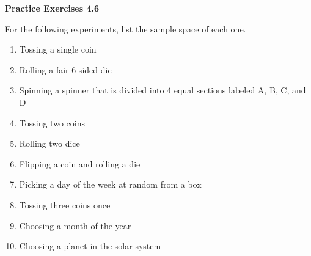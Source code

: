  \vspace{1ex}
\noindent\textbf{Practice Exercises 4.6}

\vspace{0.75ex}

For the following experiments, list the sample space of each one.

\begin{enumerate}
    \item Tossing a single coin

    \item Rolling a fair 6-sided die
    
    \item Spinning a spinner that is divided into 4 equal sections labeled A, B, C, and D
    
    \item Tossing two coins

    \item Rolling two dice

    \item Flipping a coin and rolling a die

    \item Picking a day of the week at random from a box

    \item Tossing three coins once

    \item Choosing a month of the year

    \item Choosing a planet in the solar system 

\end{enumerate}

